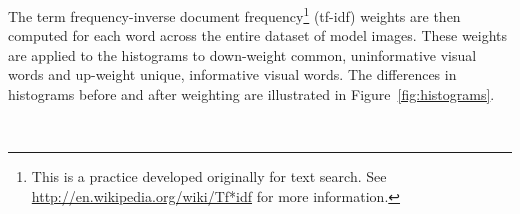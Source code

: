 \documentclass[11pt, onecolumn, a4paper, final]{report} %
\begin{document}
The term frequency-inverse document frequency\footnote{This is a practice developed originally for text search. See \url{http://en.wikipedia.org/wiki/Tf*idf} for more information.} (tf-idf) weights are then computed for each word across the entire dataset of model images. These weights are applied to the histograms to down-weight common, uninformative visual words and up-weight unique, informative visual words. The differences in histograms before and after weighting are illustrated in Figure~\ref{fig:histograms}.

\begin{figure}[htb]
\centering 
{}
~
~
\\

\end{figure}
\end{document}
